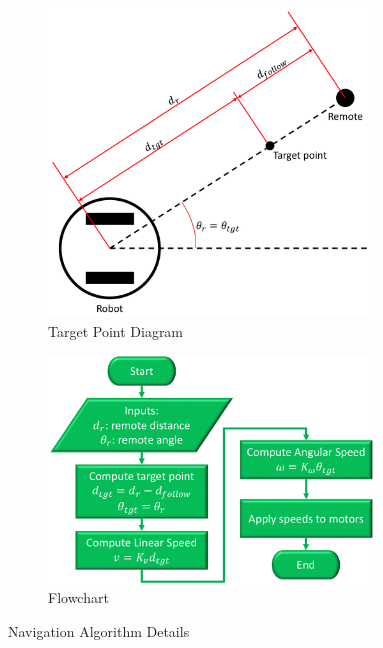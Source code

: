 \begin{figure}[H]
    \centering
    \begin{subfigure}{0.45\textwidth}
        \centering
        \includegraphics[width=0.95\textwidth]{figs/navigationAlgorithmDiagram.pdf}
        \caption{Target Point Diagram}
        \label{fig:navAlgoDiagram}
    \end{subfigure}%
    \begin{subfigure}{0.55\textwidth}
        \centering
        \includegraphics[width=0.95\textwidth]{figs/navigationAlgorithmFlowchart.pdf}
        \caption{Flowchart}
        \label{fig:navAlgoFlowchart}
    \end{subfigure}
    \caption{Navigation Algorithm Details}
    \label{fig:navAlgoDetails}
\end{figure}

